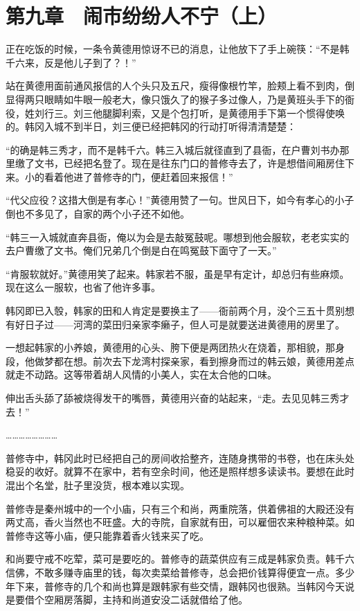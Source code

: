 \section{第九章　闹市纷纷人不宁（上）}

正在吃饭的时候，一条令黄德用惊讶不已的消息，让他放下了手上碗筷：“不是韩千六来，反是他儿子到了？！”

站在黄德用面前通风报信的人个头只及五尺，瘦得像根竹竿，脸颊上看不到肉，倒显得两只眼睛如牛眼一般老大，像只饿久了的猴子多过像人，乃是黄班头手下的衙役，姓刘行三。刘三他腿脚利索，又是个包打听，是黄德用手下第一个惯得使唤的。韩冈入城不到半日，刘三便已经把韩冈的行动打听得清清楚楚：

“的确是韩三秀才，而不是韩千六。韩三入城后就径直到了县衙，在户曹刘书办那里缴了文书，已经把名登了。现在是往东门口的普修寺去了，许是想借间厢房住下来。小的看着他进了普修寺的门，便赶着回来报信！”

“代父应役？这措大倒是有孝心！”黄德用赞了一句。世风日下，如今有孝心的小子倒也不多见了，自家的两个小子还不如他。

“韩三一入城就直奔县衙，俺以为会是去敲冤鼓呢。哪想到他会服软，老老实实的去户曹缴了文书。俺们兄弟几个倒是白在鸣冤鼓下面守了一天。”

“肯服软就好。”黄德用笑了起来。韩家若不服，虽是早有定计，却总归有些麻烦。现在这么一服软，也省了他许多事。

韩冈即已入彀，韩家的田和人肯定是要换主了——衙前两个月，没个三五十贯别想有好日子过——河湾的菜田归亲家李癞子，但人可是就要送进黄德用的房里了。

一想起韩家的小养娘，黄德用的心头、胯下便是两团热火在烧着，那相貌，那身段，他做梦都在想。前次去下龙湾村探亲家，看到擦身而过的韩云娘，黄德用差点就走不动路。这等带着胡人风情的小美人，实在太合他的口味。

伸出舌头舔了舔被烧得发干的嘴唇，黄德用兴奋的站起来，“走。去见见韩三秀才去！”

……………………

普修寺中，韩冈此时已经把自己的房间收拾整齐，连随身携带的书卷，也在床头处稳妥的收好。就算不在家中，若有空余时间，他还是照样想多读读书。要想在此时混出个名堂，肚子里没货，根本难以实现。

普修寺是秦州城中的一个小庙，只有三个和尚，两重院落，供着佛祖的大殿还没有两丈高，香火当然也不旺盛。大的寺院，自家就有田，可以雇佃农来种粮种菜。如普修寺这等小庙，便只能靠着香火钱来买了吃。

和尚要守戒不吃荤，菜可是要吃的。普修寺的蔬菜供应有三成是韩家负责。韩千六信佛，不敢多赚寺庙里的钱，每次卖菜给普修寺，总会把价钱算得便宜一点。多少年下来，普修寺的几个和尚也算是跟韩家有些交情，跟韩冈也很熟。当韩冈今天说是要借个空厢房落脚，主持和尚道安没二话就借给了他。


